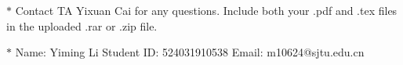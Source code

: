 \documentclass[12pt,a4paper]{article}
\theoremstyle{definition}
\begin{document}
\noindent

\noindent{}
\begin{center}
  \footnotesize{\color{red}$*$ Contact TA Yixuan Cai for any
    questions. Include both your .pdf and .tex files in the uploaded
  .rar or .zip file.}

  \footnotesize{\color{blue}$*$ Name: Yiming Li  \quad
  Student ID: 524031910538 \quad Email: m10624@sjtu.edu.cn}

\end{center}
\end{document}
